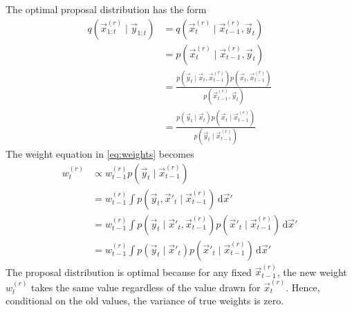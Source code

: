     The optimal proposal distribution has the form
    \begin{align}
        q(\vec x_{1:t}^{(r)} \mid \vec y_{1:t})     &= q(\vec x_t^{(r)} \mid \vec x_{t - 1}^{(r)}, \vec y_t) \\
                                                    &= p(\vec x_t^{(r)} \mid \vec x_{t - 1}^{(r)}, \vec y_t) \\
                                                    &= \frac{p(\vec y_t \mid \vec x_t, \vec x_{t-1}^{(r)}) p(\vec x_t, \vec x_{t-1}^{(r)})}{p(\vec x_{t-1}^{(r)}, \vec y_t)} \\
                                                    &= \frac{p(\vec y_t \mid \vec x_t) p(\vec x_t \mid \vec x_{t-1}^{(r)})}{p(\vec y_t \mid \vec x_{t-1}^{(r)})}
    \end{align}
    The weight equation in \eqref{eq:weights} becomes
    \begin{align}
        w_t^{(r)}   &\propto w_{t - 1}^{(r)} p\left(\vec y_t \mid \vec x_{t-1}^{(r)}\right) \\
                    &= w_{t - 1}^{(r)} \int{p(\vec y_t, \vec x'_t \mid \vec x_{t-1}^{(r)}) \,\mathrm d\vec x'} \\
                    &= w_{t - 1}^{(r)} \int{p(\vec y_t \mid \vec x'_t, \vec x_{t-1}^{(r)}) p(\vec x'_t \mid \vec x_{t-1}^{(r)}) \,\mathrm d\vec x'} \\
                    &= w_{t - 1}^{(r)} \int{p(\vec y_t \mid \vec x'_t) p(\vec x'_t \mid \vec x_{t-1}^{(r)}) \,\mathrm d\vec x'}
    \end{align}
    The proposal distribution is optimal because for any fixed $\vec x_{t-1}^{(r)}$, the new weight $w_t^{(r)}$ takes the same value regardless of the value drawn for $\vec x_t^{(r)}$. Hence, conditional on the old values, the variance of true weights is zero.